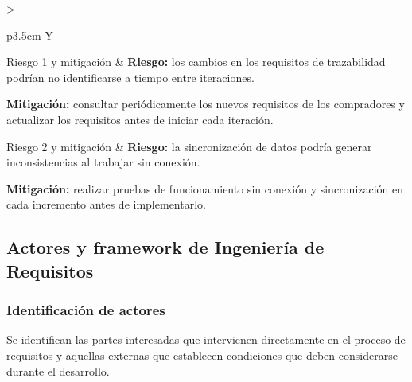 \documentclass[12pt,a4paper]{article}
\begin{document}
\begin{table}[H]
\begin{tabularx}{\textwidth}{
    >{\raggedright\arraybackslash}p{3.5cm} Y
}
Riesgo 1 y mitigación
&
\textbf{Riesgo:} los cambios en los requisitos de trazabilidad podrían no identificarse a tiempo entre iteraciones.

\medskip

\textbf{Mitigación:} consultar periódicamente los nuevos requisitos de los compradores y actualizar los requisitos antes de iniciar cada iteración.
\\
\midrule

Riesgo 2 y mitigación
&
\textbf{Riesgo:} la sincronización de datos podría generar inconsistencias al trabajar sin conexión.

\medskip

\textbf{Mitigación:} realizar pruebas de funcionamiento sin conexión y sincronización en cada incremento antes de implementarlo.
\\
\bottomrule
\end{tabularx}
\end{table}

\FloatBarrier
\subsection{Actores y framework de Ingeniería de Requisitos}

\subsubsection{Identificación de actores}

Se identifican las partes interesadas que intervienen directamente en el proceso de requisitos y aquellas externas que establecen condiciones que deben considerarse durante el desarrollo.
\end{document}
